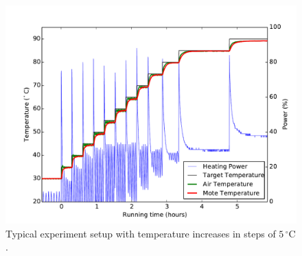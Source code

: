 \begin{figure}[t]
	\centering
    \includegraphics[width=1\columnwidth]{figures/box_heating_step}
	\caption{Typical experiment setup with temperature increases in steps of $5\,^{\circ}\mathrm{C}$.}
    \label{fig:box_heating_step}
\end{figure} 